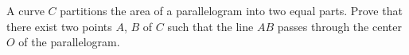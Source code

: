 A curve $C$ partitions the area of a parallelogram into two equal parts. Prove that there exist two points $A$, $B$ of $C$ such that the line $AB$ passes through the center $O$ of the parallelogram.
